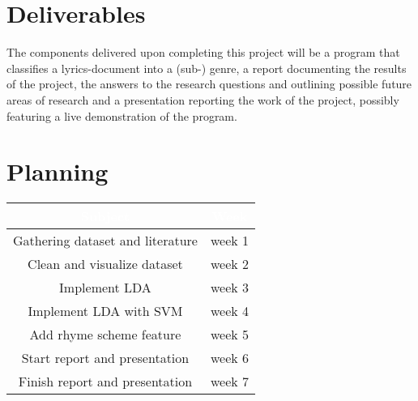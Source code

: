 \documentclass[12pt,a4paper]{amsart}
\begin{document}
\section{Deliverables}
The components delivered upon completing this project will be a program that classifies a lyrics-document into a (sub-) genre, a report documenting the results of the project, the answers to the research questions and outlining possible future areas of research and a presentation reporting the work of the project, possibly featuring a live demonstration of the program.
\section{Planning}

\begin{tabular}{ |c | c |}
\rowcolor{dark-gray}
\hline
\textcolor{white}{\textbf{Subject}} & \textcolor{white}{\textbf{Week}}\\
	\hline
	Gathering dataset and literature & week 1  \\
	\hline
	Clean and visualize dataset & week 2 \\
	\hline
	Implement LDA & week 3 \\
	\hline
	Implement LDA with SVM & week 4 \\
	\hline
	Add rhyme scheme feature & week 5 \\
	\hline
	Start report and presentation & week 6 \\
	\hline
	Finish report and presentation & week 7\\
	\hline
\end{tabular}\\



\end{document}
